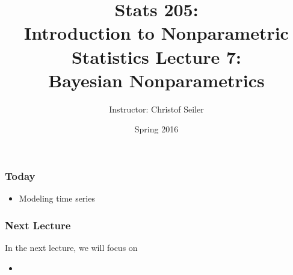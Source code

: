 \documentclass[10pt]{beamer}
\title{\large \bfseries Stats 205: \\ Introduction to Nonparametric Statistics \linebreak \linebreak \linebreak
Lecture 7: \\ Bayesian Nonparametrics}
\author{Instructor: Christof Seiler}
\date{Spring 2016}
\begin{document}
\frame{
\thispagestyle{empty}
\titlepage
}

\begin{frame}
\frametitle{Today}

\begin{itemize}
\item Modeling time series
\end{itemize}

\end{frame}

\begin{frame}
\frametitle{Next Lecture}

In the next lecture, we will focus on
\begin{itemize}
\item 
\end{itemize}

\end{frame}
\end{document}
